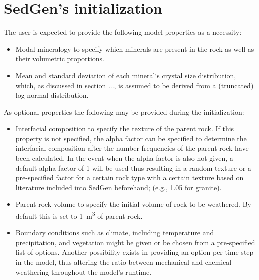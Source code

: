 \section{SedGen's initialization}
The user is expected to provide the following model properties as a necessity:
\begin{itemize}
    \item Modal mineralogy to specify which minerals are present in the rock as well as their volumetric proportions. %
    \item Mean and standard deviation of each mineral`s crystal size distribution, which, as discussed in section ..., is assumed to be derived from a (truncated) log-normal distribution. %
\end{itemize}

As optional properties the following may be provided during the initialization:
\begin{itemize}
    \item Interfacial composition to specify the texture of the parent rock. %
    If this property is not specified, the alpha factor can be specified to determine the interfacial composition after the number frequencies of the parent rock have been calculated. %
    In the event when the alpha factor is also not given, a default alpha factor of 1 will be used thus resulting in a random texture or a pre-specified factor for a certain rock type with a certain texture based on literature included into SedGen beforehand; (e.g., 1.05 for granite). %
    \item Parent rock volume to specify the initial volume of rock to be weathered.
    By default this is set to \SI{1}{\cubic\metre} of parent rock.
    \item Boundary conditions such as climate, including temperature and precipitation, and vegetation might be given or be chosen from a pre-specified list of options. %
    Another possibility exists in providing an option per time step in the model, thus altering the ratio between mechanical and chemical weathering throughout the model's runtime. %
\end{itemize}

